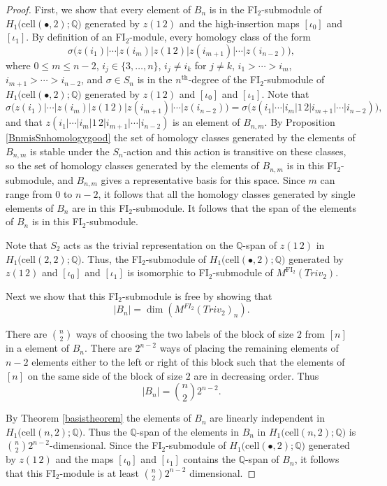 \documentclass[12py]{amsart}%
\theoremstyle{definition}\newtheorem{definition}[thm]{Definition}
\theoremstyle{definition}
\newcommand{\Q}{\ensuremath{\mathbb{Q}}}
\begin{document}
\begin{proof}
First, we show that every element of $B_{n}$ is in the FI$_{2}$-submodule of $H_{1}\big(\text{cell}(\bullet,2);\Q\big)$ generated by  $z(1\,2)$ and the high-insertion maps $[\iota_{0}]$ and $[\iota_{1}]$. By definition of an FI$_{2}$-module, every homology class of the form 
\[
\sigma\big(z(i_{1})|\cdots|z(i_{m})|z(1\,2)|z(i_{m+1})|\cdots|z(i_{n-2})\big),
\]
where $0\le m\le n-2$, $i_{j}\in \{3,\dots, n\}$, $i_{j}\neq i_{k}$ for $j\neq k$, $i_{1}>\cdots>i_{m}$, $i_{m+1}>\cdots>i_{n-2}$, and $\sigma\in S_{n}$ is in the $n^{\text{th}}$-degree of the FI$_{2}$-submodule of $H_{1}\big(\text{cell}(\bullet,2);\Q\big)$ generated by $z(1\,2)$ and $[\iota_{0}]$ and $[\iota_{1}]$. Note that 
 \[
 \sigma\big(z(i_{1})|\cdots|z(i_{m})|z(1\,2)|z(i_{m+1})|\cdots|z(i_{n-2})\big)=\sigma\big(z(i_{1}|\cdots|i_{m}|1\,2|i_{m+1}|\cdots|i_{n-2})\big),
 \]
and that $z(i_{1}|\cdots|i_{m}|1\,2|i_{m+1}|\cdots|i_{n-2})$ is an element of $B_{n,m}$. By Proposition \ref{BnmisSnhomologygood} the set of homology classes generated by the elements of $B_{n,m}$ is stable under the $S_{n}$-action and this action is transitive on these classes, so the set of homology classes generated by the elements of $B_{n,m}$ is in this FI$_{2}$-submodule, and $B_{n,m}$ gives a representative basis for this space. Since $m$ can range from $0$ to $n-2$, it follows that all the homology classes generated by single elements of $B_{n}$ are in this FI$_{2}$-submodule. It follows that the span of the elements of $B_{n}$ is in this FI$_{2}$-submodule.

Note that $S_{2}$ acts as the trivial representation on the $\Q$-span of $z(1\,2)$ in $H_{1}\big(\text{cell}(2,2);\Q\big)$. Thus, the FI$_{2}$-submodule of $H_{1}\big(\text{cell}(\bullet,2);\Q\big)$ generated by $z(1\,2)$ and $[\iota_{0}]$ and $[\iota_{1}]$ is isomorphic to FI$_{2}$-submodule of $M^{\text{FI}_{2}}(Triv_{2})$.

Next we show that this FI$_{2}$-submodule is free by showing that 
\[
|B_{n}|=\dim(M^{FI_{2}}(Triv_{2})_{n}).
\]

There are $\binom{n}{2}$ ways of choosing the two labels of the block of size $2$ from $[n]$ in a element of $B_{n}$. There are $2^{n-2}$ ways of placing the remaining elements of $n-2$ elements either to the left or right of this block such that the elements of $[n]$ on the same side of the block of size $2$ are in decreasing order. Thus 
\[
|B_{n}|=\binom{n}{2}2^{n-2}.
\]

By Theorem \ref{basistheorem} the elements of $B_{n}$ are linearly independent in $H_{1}\big(\text{cell}(n,2);\Q\big)$. Thus the $\Q$-span of the elements in $B_{n}$ in $H_{1}\big(\text{cell}(n,2);\Q\big)$ is $\binom{n}{2}2^{n-2}$-dimensional. Since the FI$_{2}$-submodule of $H_{1}\big(\text{cell}(\bullet,2);\Q\big)$ generated by $z(1\,2)$ and the maps $[\iota_{0}]$ and $[\iota_{1}]$ contains the $\Q$-span of $B_{n}$, it follows that this FI$_{2}$-module is at least $\binom{n}{2}2^{n-2}$ dimensional. 


\end{proof}
\end{document}

